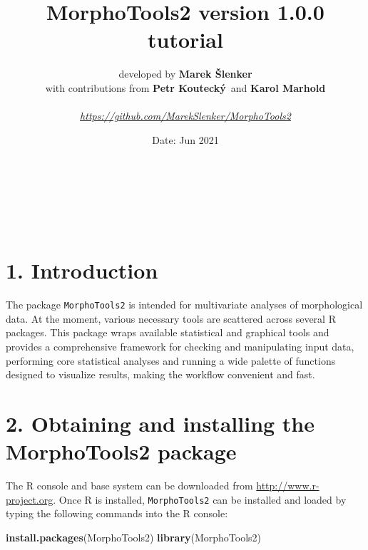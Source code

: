 \documentclass[
]{article}
\title{\vspace{+2.0cm} MorphoTools2 version 1.0.0 tutorial \vspace{+2.0cm}}
\author{developed by \textbf{Marek
Šlenker}\footnotemark[2] \footnotemark[3] \footnotemark[1] \vspace*{0.5pc}\\
with contributions from \textbf{Petr Koutecký}\footnotemark[4] ~and
\textbf{Karol
Marhold}\footnotemark[2] \footnotemark[3] \vspace*{0.7pc}\\
\vspace*{0.7pc}\\
\emph{\url{https://github.com/MarekSlenker/MorphoTools2}}}
\date{Date: Jun 2021}
\newenvironment{Shaded}{\begin{snugshade}}{\end{snugshade}}
\newcommand{\KeywordTok}[1]{\textcolor[rgb]{0.13,0.29,0.53}{\textbf{#1}}}
\newcommand{\NormalTok}[1]{#1}
\begin{document}
\maketitle

~\\
\renewcommand{\thefootnote}{\fnsymbol{footnote}}\\
\\

\newpage

\renewcommand{\baselinestretch}{0.4}
\setcounter{tocdepth}{4}
\tableofcontents
\renewcommand{\baselinestretch}{1.0}\normalsize

\hypertarget{introduction}{%
\section{1. Introduction}\label{introduction}}

The package \texttt{MorphoTools2} is intended for multivariate analyses
of morphological data. At the moment, various necessary tools are
scattered across several R packages. This package wraps available
statistical and graphical tools and provides a comprehensive framework
for checking and manipulating input data, performing core statistical
analyses and running a wide palette of functions designed to visualize
results, making the workflow convenient and fast.

\renewcommand{\thefootnote}{\arabic{footnote}}
\vspace*{1.7pc}

\hypertarget{obtaining-and-installing-the-morphotools2-package}{%
\section{2. Obtaining and installing the MorphoTools2
package}\label{obtaining-and-installing-the-morphotools2-package}}

The R console and base system can be downloaded from
\url{http://www.r-project.org}. Once R is installed,
\texttt{MorphoTools2} can be installed and loaded by typing the
following commands into the R console:

\begin{Shaded}
\begin{Highlighting}[]
\KeywordTok{install.packages}\NormalTok{(MorphoTools2)}
\KeywordTok{library}\NormalTok{(MorphoTools2)}
\end{Highlighting}
\end{Shaded}
\end{document}
